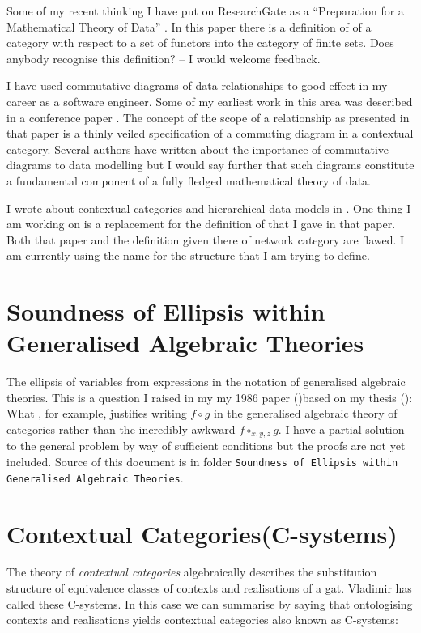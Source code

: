 \documentclass[10pt,a4paper]{article}
\theoremstyle{remark}
\newcommand {\myfirstpaper}{my 1986 paper (\cite{Cartmell86})based on my thesis (\cite{Cartmell78})}
\begin{document}
\note
Some of my recent thinking I have put on ResearchGate as a ``Preparation for a Mathematical Theory of Data''
\cite{CartmellPreparation}. In this paper there is a definition of  of a category with respect to a set of functors into the category of finite sets. Does anybody recognise this definition? -- I would welcome feedback.

\note 
I have used commutative diagrams of data relationships to good effect in my career as a software engineer. 
Some of my earliest work in this area was described in a conference paper  \cite{CartmellScopePaper}. 
The concept of the scope of a relationship as presented in that paper is a thinly veiled
specification of a commuting diagram in a contextual category. 
Several authors have written about the importance of commutative diagrams to data modelling but 
I would say further that such diagrams constitute a fundamental component of a fully fledged mathematical theory of data.

\note
I wrote about contextual categories and hierarchical data models in \cite{CartmellNetworkDataModel}.
One thing I am working on  is a replacement for the definition 
 of  that I gave in that paper. Both that paper and the definition given there of network category are flawed.
I am currently using the name  for the structure that I am trying to define.

\section{Soundness of Ellipsis within Generalised Algebraic Theories}
\note
The ellipsis of variables from expressions in the notation of generalised algebraic theories. 
This is a question I raised in my \myfirstpaper :
What , for example, justifies writing $f \circ g$ in the generalised algebraic theory of categories rather than the incredibly awkward $f \circ_{x,y,z} g$. 
I have a partial solution to the general problem by way of sufficient conditions but the proofs are not yet included. 
Source of this 
document is in folder {\small \texttt{Soundness of Ellipsis within Generalised Algebraic Theories}}.

\section{Contextual Categories(C-systems)}

\note The theory of \textit{contextual categories} algebraically describes the substitution structure of equivalence classes of contexts and realisations of a gat. Vladimir has called  these C-systems. In this case we can summarise by saying that ontologising contexts and realisations yields contextual categories also known as C-systems:
\end{document}
